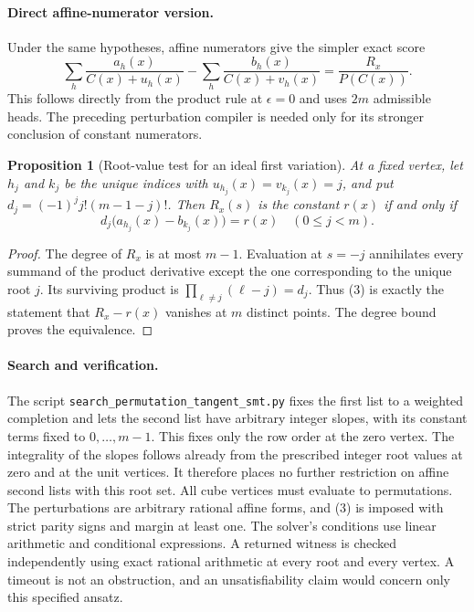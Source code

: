 \documentclass[11pt]{article}
\newtheorem{proposition}[theorem]{Proposition}
\begin{document}
\paragraph{Direct affine-numerator version.}
Under the same hypotheses, affine numerators give the simpler exact
score
\[
 \sum_h\frac{a_h(x)}{C(x)+u_h(x)}-
 \sum_h\frac{b_h(x)}{C(x)+v_h(x)}
             =\frac{R_x}{P(C(x))}.
\]
This follows directly from the product rule at $\epsilon=0$ and
uses $2m$ admissible heads. The preceding perturbation compiler is
needed only for its stronger conclusion of constant numerators.

\begin{proposition}[Root-value test for an ideal first variation]
At a fixed vertex, let $h_j$ and $k_j$ be the unique indices with
$u_{h_j}(x)=v_{k_j}(x)=j$, and put
$d_j=(-1)^j j!(m-1-j)!$. Then $R_x(s)$ is the constant $r(x)$
if and only if
\[
 d_j\big(a_{h_j}(x)-b_{k_j}(x)\big)=r(x)
                   \quad(0\le j<m).
\tag{3}
\]
\end{proposition}
\begin{proof}
The degree of $R_x$ is at most $m-1$. Evaluation at $s=-j$
annihilates every summand of the product derivative except the
one corresponding to the unique root $j$. Its surviving product is
$\prod_{\ell\ne j}(\ell-j)=d_j$. Thus (3) is exactly the
statement that $R_x-r(x)$ vanishes at $m$ distinct points.
The degree bound proves the equivalence.
\end{proof}

\paragraph{Search and verification.}
The script \texttt{search\_permutation\_tangent\_smt.py} fixes the
first list to a weighted completion and lets the second list have
arbitrary integer slopes, with its constant terms fixed to
$0,\ldots,m-1$. This fixes only the row order at the zero vertex.
The integrality of the slopes follows already from the prescribed
integer root values at zero and at the unit vertices. It therefore
places no further restriction on affine second lists with this root set.
All cube vertices must evaluate to permutations. The perturbations
are arbitrary rational affine forms, and (3) is imposed with strict
parity signs and margin at least one. The solver's conditions use
linear arithmetic and conditional expressions. A returned witness
is checked independently using exact rational arithmetic at every
root and every vertex. A timeout is not an obstruction, and an
unsatisfiability claim would concern only this specified ansatz.
\end{document}
